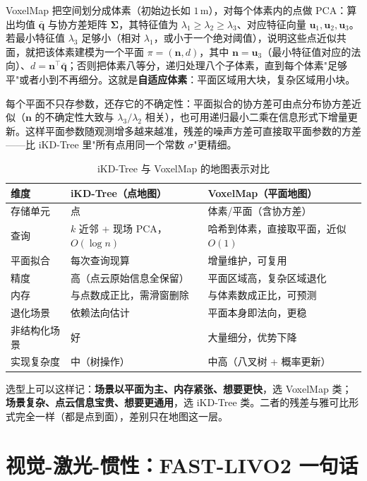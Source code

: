 VoxelMap 把空间划分成体素（初始边长如 $1$\,m），对每个体素内的点做 PCA：算出均值 $\bar{\bm{q}}$ 与协方差矩阵 $\bm{\Sigma}$，其特征值为 $\lambda_1\ge\lambda_2\ge\lambda_3$、对应特征向量 $\bm{u}_1,\bm{u}_2,\bm{u}_3$。若最小特征值 $\lambda_3$ 足够小（相对 $\lambda_1$，或小于一个绝对阈值），说明这些点近似共面，就把该体素建模为一个平面 $\pi=(\bm{n},d)$，其中 $\bm{n}=\bm{u}_3$（最小特征值对应的法向）、$d=\bm{n}^{\top}\bar{\bm{q}}$；否则把体素八等分，递归处理八个子体素，直到每个体素"足够平"或者小到不再细分。这就是\textbf{自适应体素}：平面区域用大块，复杂区域用小块。

每个平面不只存参数，还存它的不确定性：平面拟合的协方差可由点分布协方差近似（$\bm{n}$ 的不确定性大致与 $\lambda_3/\lambda_2$ 相关），也可用递归最小二乘在信息形式下增量更新。这样平面参数随观测增多越来越准，残差的噪声方差可直接取平面参数的方差——比 iKD-Tree 里"所有点用同一个常数 $\sigma$"更精细。

\begin{table}[htbp]
  \centering
  \caption{iKD-Tree 与 VoxelMap 的地图表示对比}\label{tab:17-map}
  \small
  \begin{tabular}{lll}
    \toprule
    维度 & iKD-Tree（点地图） & VoxelMap（平面地图） \\
    \midrule
    存储单元 & 点 & 体素/平面（含协方差） \\
    查询 & $k$ 近邻 + 现场 PCA，$O(\log n)$ & 哈希到体素，直接取平面，近似 $O(1)$ \\
    平面拟合 & 每次查询现算 & 增量维护，可复用 \\
    精度 & 高（点云原始信息全保留） & 平面区域高，复杂区域退化 \\
    内存 & 与点数成正比，需滑窗删除 & 与体素数成正比，可预测 \\
    退化场景 & 依赖法向估计 & 平面本身即法向，更稳 \\
    非结构化场景 & 好 & 大量细分，优势下降 \\
    实现复杂度 & 中（树操作） & 中高（八叉树 + 概率更新） \\
    \bottomrule
  \end{tabular}
\end{table}

选型上可以这样记：\textbf{场景以平面为主、内存紧张、想要更快}，选 VoxelMap 类；\textbf{场景复杂、点云信息宝贵、想要更通用}，选 iKD-Tree 类。二者的残差与雅可比形式完全一样（都是点到面），差别只在地图这一层。

\section{视觉-激光-惯性：FAST-LIVO2 一句话}\label{sec:17-livo}

